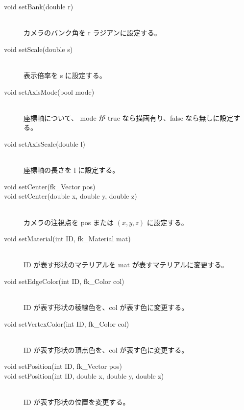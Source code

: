 \begin{description}
 \item[\hspace*{0.6cm}void setBank(double r)] ~ \\
	カメラのバンク角を r ラジアンに設定する。

 \item[\hspace*{0.6cm}void setScale(double s)] ~ \\
	表示倍率を s に設定する。

 \item[\hspace*{0.6cm}void setAxisMode(bool mode)] ~ \\
	座標軸について、
	mode が true なら描画有り、false なら無しに設定する。

 \item[\hspace*{0.6cm}void setAxisScale(double l)] ~ \\
	座標軸の長さを l に設定する。

 \item[\hspace*{0.6cm}void setCenter(fk\_Vector pos)]
 \item[\hspace*{0.6cm}void setCenter(double x, double y, double z)] ~ \\
	カメラの注視点を pos または \((x, y, z)\) に設定する。

 \item[\hspace*{0.6cm}void setMaterial(int ID, fk\_Material mat)] ~ \\
	ID が表す形状のマテリアルを mat が表すマテリアルに変更する。

 \item[\hspace*{0.6cm}void setEdgeColor(int ID, fk\_Color col)] ~ \\
	ID が表す形状の稜線色を、col が表す色に変更する。

 \item[\hspace*{0.6cm}void setVertexColor(int ID, fk\_Color col)] ~ \\
	ID が表す形状の頂点色を、col が表す色に変更する。

 \item[\hspace*{0.6cm}void setPosition(int ID, fk\_Vector pos)]
 \item[\hspace*{0.6cm}
	void setPosition(int ID, double x, double y, double z)] ~ \\
	ID が表す形状の位置を変更する。


\end{description}
